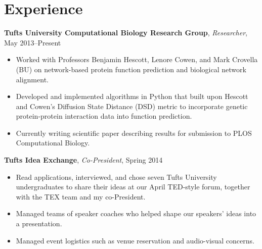 \documentclass[10pt, letter]{article}
\begin{document}
\section*{Experience}
{\bf Tufts University Computational Biology Research Group}, {\em Researcher}, May 2013--Present\\
\vspace*{-.15in} 
\begin{itemize}[topsep=0pt,itemsep=-1pt]
    \item Worked with Professors Benjamin Hescott, Lenore Cowen, and Mark Crovella (BU) on network-based protein function prediction and biological network alignment.
    \item Developed and implemented algorithms in Python that built upon Hescott and Cowen's Diffusion State Distance (DSD) metric to incorporate genetic protein-protein interaction data into function prediction.
    \item Currently writing scientific paper describing results for submission to PLOS Computational Biology.
\end{itemize}
\vspace{6pt}
{\bf Tufts Idea Exchange}, {\em Co-President}, Spring 2014\\
\vspace*{-.15in}
\begin{itemize}[topsep=0pt, itemsep=1pt]
  \item Read applications, interviewed, and chose seven Tufts University undergraduates to share their ideas at our April TED-style forum, together with the TEX team and my co-President.
  \item Managed teams of speaker coaches who helped shape our speakers' ideas into a presentation.
  \item Managed event logistics such as venue reservation and audio-visual concerns.
\end{itemize}
\end{document}
